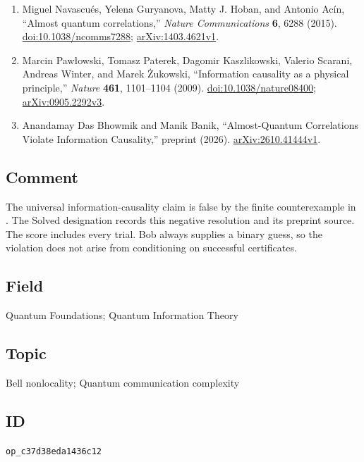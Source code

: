\begin{enumerate}[label={},leftmargin=4.8em,labelsep=0.5em]
  \footnotesize
  \item[\textup{[NGHA15]}]\label{ref:c37d-ngha}
  Miguel Navascu\'es, Yelena Guryanova, Matty J. Hoban, and Antonio Ac\'in,
``Almost quantum correlations,'' \emph{Nature Communications} \textbf{6},
6288 (2015).
\href{https://doi.org/10.1038/ncomms7288}{doi:10.1038/ncomms7288};
\href{https://arxiv.org/abs/1403.4621v1}{arXiv:1403.4621v1}.

  \item[\textup{[PPKSWZ09]}]\label{ref:c37d-ic-original}
  Marcin Paw\l{}owski, Tomasz Paterek, Dagomir Kaszlikowski, Valerio Scarani,
Andreas Winter, and Marek Żukowski,
``Information causality as a physical principle,'' \emph{Nature}
\textbf{461}, 1101--1104 (2009).
\href{https://doi.org/10.1038/nature08400}{doi:10.1038/nature08400};
\href{https://arxiv.org/abs/0905.2292v3}{arXiv:0905.2292v3}.

  \item[\textup{[BB26]}]\label{ref:c37d-bb}
  Anandamay Das Bhowmik and Manik Banik,
``Almost-Quantum Correlations Violate Information Causality,'' preprint (2026).
\href{https://arxiv.org/abs/2610.41444v1}{arXiv:2610.41444v1}.
\end{enumerate}

\subsection*{Comment}

The universal information-causality claim is false by the finite
counterexample in .
The Solved designation records this negative resolution and its preprint source.
The score includes every trial.
Bob always supplies a binary guess, so the
violation does not arise from conditioning on successful certificates.

\subsection*{Field}

Quantum Foundations; Quantum Information Theory

\subsection*{Topic}

Bell nonlocality; Quantum communication complexity

\subsection*{ID}

\texttt{op\_c37d38eda1436c12}
